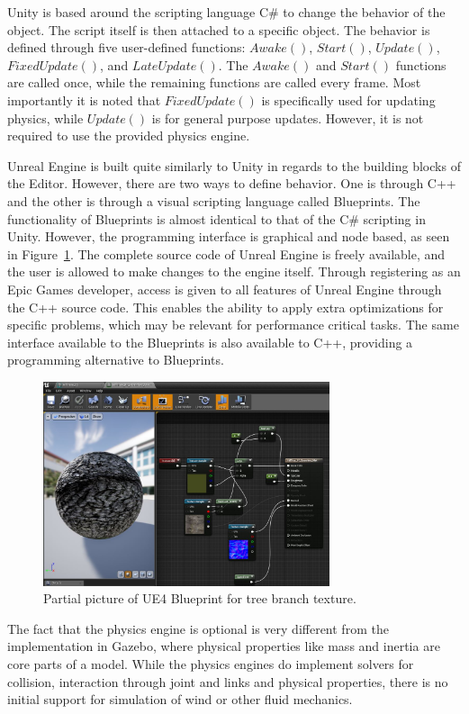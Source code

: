 Unity is based around the scripting language C\# to change the behavior of the object. The script itself is then attached to a specific object. The behavior is defined through five user-defined functions: $Awake()$, $Start()$, $Update()$, $FixedUpdate()$, and $LateUpdate()$. The $Awake()$ and $Start()$ functions are called once, while the remaining functions are called every frame. Most importantly it is noted that $FixedUpdate()$ is specifically used for updating physics, while $Update()$ is for general purpose updates. However, it is not required to use the provided physics engine.

Unreal Engine is built quite similarly to Unity in regards to the building blocks of the Editor. However, there are two ways to define behavior. One is through C++ and the other is through a visual scripting language called Blueprints. The functionality of Blueprints is almost identical to that of the C\# scripting in Unity. However, the programming interface is graphical and node based, as seen in Figure~\ref{fig:blueprint_editor}. The complete source code of Unreal Engine is freely available, and the user is allowed to make changes to the engine itself. Through registering as an Epic Games developer, access is given to all features of Unreal Engine through the C++ source code. This enables the ability to apply extra optimizations for specific problems, which may be relevant for performance critical tasks. The same interface available to the Blueprints is also available to C++, providing a programming alternative to Blueprints.

\begin{figure}[!htb]
    \centering
    \includegraphics[height = 6cm]{rapport/fig/Simulator/blueprintprog.JPG}
    \caption{Partial picture of UE4 Blueprint for tree branch texture.}
    \label{fig:blueprint_editor}
\end{figure}

The fact that the physics engine is optional is very different from the implementation in Gazebo, where physical properties like mass and inertia are core parts of a model. While the physics engines do implement solvers for collision, interaction through joint and links and physical properties, there is no initial support for simulation of wind or other fluid mechanics.

